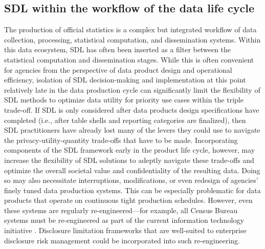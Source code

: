 \subsection{SDL within the workflow of the data life cycle}
The production of official statistics is a complex but integrated workflow of data collection, processing, statistical computation, and dissemination systems. Within this data ecosystem, SDL has often been inserted as a filter between the statistical computation and dissemination stages. While this is often convenient for agencies from the perspective of data product design and operational efficiency, isolation of SDL decision-making and implementation at this point relatively late in the data production cycle can significantly limit the flexibility of SDL methods to optimize data utility for priority use cases within the triple trade-off. If SDL is only considered after data products design specifications have completed (i.e., after table shells and reporting categories are finalized), then SDL practitioners have already lost many of the levers they could use to navigate the privacy-utility-quantity trade-offs that have to be made. Incorporating components of the SDL framework early in the product life cycle, however, may increase the flexibility of SDL solutions to adeptly navigate these trade-offs and optimize the overall societal value and confidentiality of the resulting data. Doing so may also necessitate interruptions, modifications, or even redesign of agencies' finely tuned data production systems. This can be especially problematic for data products that operate on continuous tight production schedules. However, even these systems are regularly re-engineered---for example, all Census Bureau systems must be re-engineered as part of the current information technology initiative \cite{thieme:2022}. Disclosure limitation frameworks that are well-suited to enterprise disclosure risk management could be incorporated into such re-engineering.

